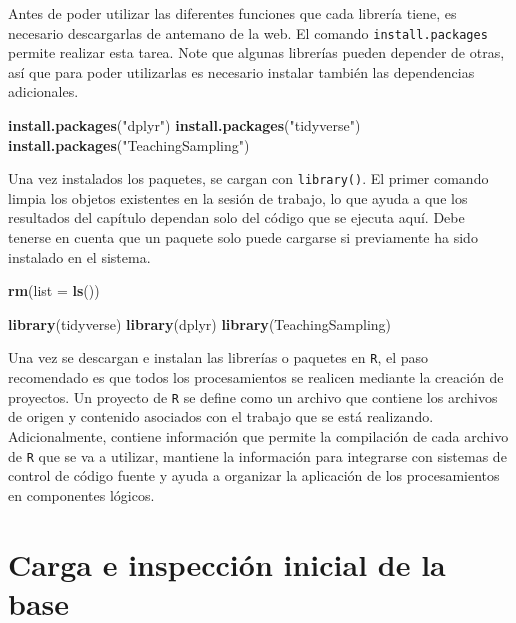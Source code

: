 \documentclass[
  spanish,
  12pt,
]{book}
\newenvironment{Shaded}{\begin{snugshade}}{\end{snugshade}}
\newcommand{\AttributeTok}[1]{\textcolor[rgb]{0.13,0.29,0.53}{#1}}
\newcommand{\FunctionTok}[1]{\textcolor[rgb]{0.13,0.29,0.53}{\textbf{#1}}}
\newcommand{\NormalTok}[1]{#1}
\newcommand{\StringTok}[1]{\textcolor[rgb]{0.31,0.60,0.02}{#1}}
\begin{document}
Antes de poder utilizar las diferentes funciones que cada librería tiene, es necesario descargarlas de antemano de la web. El comando \texttt{install.packages} permite realizar esta tarea. Note que algunas librerías pueden depender de otras, así que para poder utilizarlas es necesario instalar también las dependencias adicionales.

\begin{Shaded}
\begin{Highlighting}[]
\FunctionTok{install.packages}\NormalTok{(}\StringTok{"dplyr"}\NormalTok{)}
\FunctionTok{install.packages}\NormalTok{(}\StringTok{"tidyverse"}\NormalTok{)}
\FunctionTok{install.packages}\NormalTok{(}\StringTok{"TeachingSampling"}\NormalTok{)}
\end{Highlighting}
\end{Shaded}

Una vez instalados los paquetes, se cargan con \texttt{library()}. El primer comando limpia los objetos existentes en la sesión de trabajo, lo que ayuda a que los resultados del capítulo dependan solo del código que se ejecuta aquí. Debe tenerse en cuenta que un paquete solo puede cargarse si previamente ha sido instalado en el sistema.

\begin{Shaded}
\begin{Highlighting}[]
\FunctionTok{rm}\NormalTok{(}\AttributeTok{list =} \FunctionTok{ls}\NormalTok{())}

\FunctionTok{library}\NormalTok{(tidyverse)}
\FunctionTok{library}\NormalTok{(dplyr)}
\FunctionTok{library}\NormalTok{(TeachingSampling)}
\end{Highlighting}
\end{Shaded}

Una vez se descargan e instalan las librerías o paquetes en \texttt{R}, el paso recomendado es que todos los procesamientos se realicen mediante la creación de proyectos. Un proyecto de \texttt{R} se define como un archivo que contiene los archivos de origen y contenido asociados con el trabajo que se está realizando. Adicionalmente, contiene información que permite la compilación de cada archivo de \texttt{R} que se va a utilizar, mantiene la información para integrarse con sistemas de control de código fuente y ayuda a organizar la aplicación de los procesamientos en componentes lógicos.

\section{Carga e inspección inicial de la base}\label{carga-e-inspeccion-inicial-de-la-base}
\end{document}

